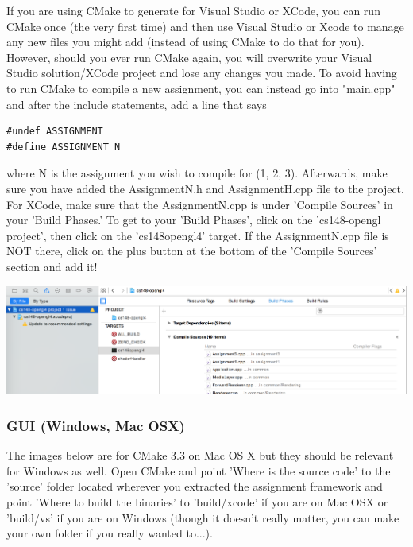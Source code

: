 \documentclass{article}
\begin{document}
If you are using CMake to generate for Visual Studio or XCode, you can run CMake once (the very first time) and then use Visual Studio or Xcode to manage any new files you might add (instead of using CMake to do that for you). However, should you ever run CMake again, you will overwrite your Visual Studio solution/XCode project and lose any changes you made. To avoid having to run CMake to compile a new assignment, you can instead go into "main.cpp" and after the include statements, add a line that says 
\begin{lstlisting}
#undef ASSIGNMENT
#define ASSIGNMENT N
\end{lstlisting}

where N is the assignment you wish to compile for (1, 2, 3). Afterwards, make sure you have added the AssignmentN.h and AssignmentH.cpp file to the project. For XCode, make sure that the AssignmentN.cpp is under 'Compile Sources' in your 'Build Phases.' To get to your 'Build Phases', click on the 'cs148-opengl project', then click on the 'cs148opengl4' target. If the AssignmentN.cpp file is NOT there, click on the plus button at the bottom of the 'Compile Sources' section and add it!

\includegraphics[width=\linewidth]{xcode4.png}

\subsubsection*{GUI (Windows, Mac OSX)}

The images below are for CMake 3.3 on Mac OS X but they should be relevant for Windows as well. Open CMake and point 'Where is the source code' to the 'source' folder located wherever you extracted the assignment framework and point 'Where to build the binaries' to 'build/xcode' if you are on Mac OSX or 'build/vs' if you are on Windows (though it doesn't really matter, you can make your own folder if you really wanted to...).
\end{document}
